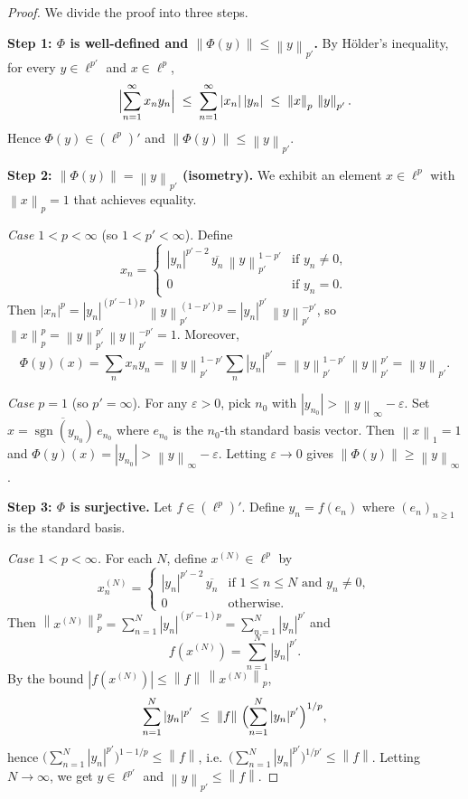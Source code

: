 \documentclass[a4paper,12pt]{book}
\DeclareMathOperator{\sgn}{sgn}
\newcommand{\norm}[1]{\left\| #1 \right\|}
\theoremstyle{definition}
\theoremstyle{plain}
\theoremstyle{remark}
\begin{document}
\begin{proof}
We divide the proof into three steps.

\medskip\noindent\textbf{Step 1: $\Phi$ is well-defined and $\norm{\Phi(y)} \le \norm{y}_{p'}$.}
By H\"older's inequality, for every $y\in\ell^{p'}$ and $x\in\ell^p$,
\[
  \Bigl|\sum_{n=1}^\infty x_n y_n\Bigr|
  \;\le\; \sum_{n=1}^\infty |x_n|\,|y_n|
  \;\le\; \norm{x}_p\,\norm{y}_{p'}.
\]
Hence $\Phi(y)\in(\ell^p)'$ and $\norm{\Phi(y)} \le \norm{y}_{p'}$.

\medskip\noindent\textbf{Step 2: $\norm{\Phi(y)} = \norm{y}_{p'}$ (isometry).}
We exhibit an element $x\in\ell^p$ with $\norm{x}_p = 1$ that achieves
equality.

\emph{Case $1 < p < \infty$} (so $1 < p' < \infty$).
Define
\[
  x_n = \begin{cases}
    |y_n|^{p'-2}\,\overline{y_n}\,\norm{y}_{p'}^{1-p'} & \text{if } y_n\ne 0,\\
    0 & \text{if } y_n=0.
  \end{cases}
\]
Then $|x_n|^p = |y_n|^{(p'-1)p}\,\norm{y}_{p'}^{(1-p')p}
= |y_n|^{p'}\,\norm{y}_{p'}^{-p'}$, so
$\norm{x}_p^p = \norm{y}_{p'}^{p'}\,\norm{y}_{p'}^{-p'} = 1$.
Moreover,
\[
  \Phi(y)(x) = \sum_n x_n y_n
  = \norm{y}_{p'}^{1-p'}\sum_n |y_n|^{p'}
  = \norm{y}_{p'}^{1-p'}\,\norm{y}_{p'}^{p'}
  = \norm{y}_{p'}.
\]

\emph{Case $p=1$} (so $p'=\infty$).
For any $\varepsilon>0$, pick $n_0$ with $|y_{n_0}|>\norm{y}_\infty - \varepsilon$.
Set $x = \overline{\sgn(y_{n_0})}\,e_{n_0}$ where $e_{n_0}$ is the $n_0$-th
standard basis vector.  Then $\norm{x}_1=1$ and
$\Phi(y)(x) = |y_{n_0}|>\norm{y}_\infty - \varepsilon$.  Letting
$\varepsilon\to 0$ gives $\norm{\Phi(y)}\ge\norm{y}_\infty$.

\medskip\noindent\textbf{Step 3: $\Phi$ is surjective.}
Let $f\in(\ell^p)'$.  Define $y_n = f(e_n)$ where $(e_n)_{n\ge 1}$ is the
standard basis.

\emph{Case $1 < p < \infty$.}
For each $N$, define $x^{(N)}\in\ell^p$ by
\[
  x^{(N)}_n = \begin{cases}
    |y_n|^{p'-2}\,\overline{y_n} & \text{if } 1\le n\le N \text{ and } y_n\ne 0,\\
    0 & \text{otherwise}.
  \end{cases}
\]
Then $\norm{x^{(N)}}_p^p = \sum_{n=1}^N |y_n|^{(p'-1)p} = \sum_{n=1}^N |y_n|^{p'}$
and
\[
  f(x^{(N)}) = \sum_{n=1}^N |y_n|^{p'}.
\]
By the bound $|f(x^{(N)})|\le\norm{f}\,\norm{x^{(N)}}_p$,
\[
  \sum_{n=1}^N |y_n|^{p'}
  \;\le\; \norm{f}\,\Bigl(\sum_{n=1}^N |y_n|^{p'}\Bigr)^{1/p},
\]
hence $\bigl(\sum_{n=1}^N |y_n|^{p'}\bigr)^{1-1/p}\le\norm{f}$,
i.e.\ $\bigl(\sum_{n=1}^N |y_n|^{p'}\bigr)^{1/p'}\le\norm{f}$.
Letting $N\to\infty$, we get $y\in\ell^{p'}$ and $\norm{y}_{p'}\le\norm{f}$.


\end{proof}
\end{document}
